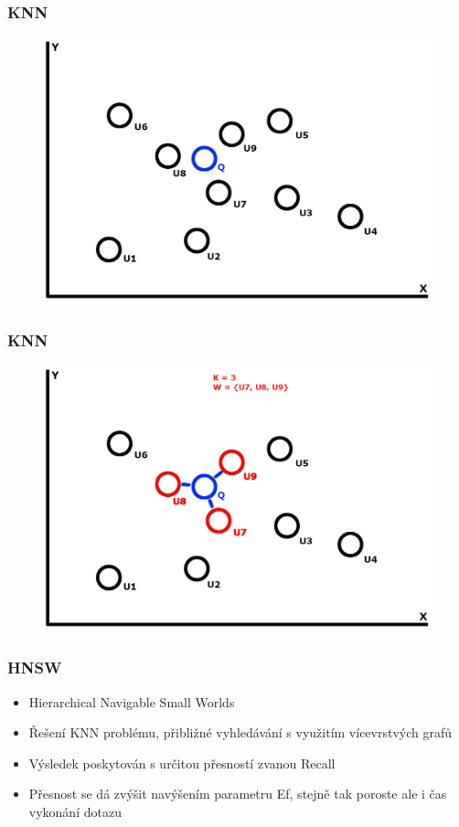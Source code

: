 \documentclass{beamer}
\begin{document}
	\begin{frame}
		\frametitle{KNN}
		\begin{figure}
			\includegraphics[scale=0.2]{figures/KNN_b2.jpg}
		\end{figure}
	\end{frame}

	\begin{frame}
		\frametitle{KNN}
		\begin{figure}
			\includegraphics[scale=0.2]{figures/KNN_b3.jpg}
		\end{figure}
	\end{frame}

	\begin{frame}
		\frametitle{HNSW}
		
		\begin{itemize}
			\item Hierarchical Navigable Small Worlds
			\item Řešení KNN problému, přibližné vyhledávání s využitím vícevrstvých grafů
			\item Výsledek poskytován s určitou přesností zvanou Recall
			\item Přesnost se dá zvýšit navýšením parametru Ef, stejně tak poroste ale i čas vykonání dotazu
		\end{itemize}
		
	\end{frame}
\end{document}
